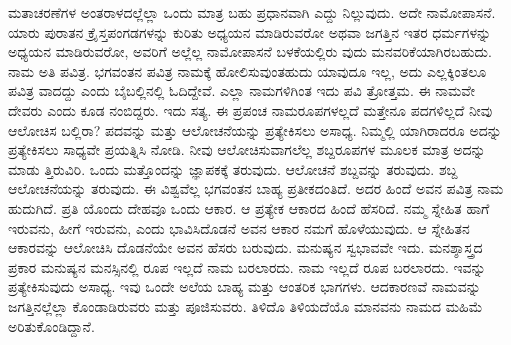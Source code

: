 ಮತಾಚರಣೆಗಳ ಅಂತರಾಳದಲ್ಲೆಲ್ಲಾ ಒಂದು ಮಾತ್ರ ಬಹು ಪ್ರಧಾನವಾಗಿ ಎದ್ದು ನಿಲ್ಲುವುದು. ಅದೇ ನಾಮೋಪಾಸನೆ. ಯಾರು ಪುರಾತನ ಕ್ರೈಸ್ತಪಂಗಡಗಳನ್ನು ಕುರಿತು ಅಧ್ಯಯನ ಮಾಡಿರುವರೋ ಅಥವಾ ಜಗತ್ತಿನ ಇತರ ಧರ್ಮಗಳನ್ನು ಅಧ್ಯಯನ ಮಾಡಿರುವರೋ, ಅವರಿಗೆ ಅಲ್ಲೆಲ್ಲ ನಾಮೋಪಾಸನೆ ಬಳಕೆಯಲ್ಲಿರು ವುದು ಮನವರಿಕೆಯಾಗಿರಬಹುದು. ನಾಮ ಅತಿ ಪವಿತ್ರ. ಭಗವಂತನ ಪವಿತ್ರ ನಾಮಕ್ಕೆ ಹೋಲಿಸುವುಂತಹುದು ಯಾವುದೂ ಇಲ್ಲ, ಅದು ಎಲ್ಲಕ್ಕಿಂತಲೂ ಪವಿತ್ರ ವಾದದ್ದು ಎಂದು ಬೈಬಲ್ಲಿನಲ್ಲಿ ಓದಿದ್ದೇವೆ. ಎಲ್ಲಾ ನಾಮಗಳಿಗಿಂತ ಇದು ಪವಿ ತ್ರೋತ್ತಮ. ಈ ನಾಮವೇ ದೇವರು ಎಂದು ಕೂಡ ನಂಬಿದ್ದರು. ಇದು ಸತ್ಯ. ಈ ಪ್ರಪಂಚ ನಾಮರೂಪಗಳಲ್ಲದೆ ಮತ್ತೇನೂ ಪದಗಳಿಲ್ಲದೆ ನೀವು ಆಲೋಚಿಸ ಬಲ್ಲಿರಾ? ಪದವನ್ನು ಮತ್ತು ಆಲೋಚನೆಯನ್ನು ಪ್ರತ್ಯೇಕಿಸಲು ಅಸಾಧ್ಯ. ನಿಮ್ಮಲ್ಲಿ ಯಾಗಿರಾದರೂ ಅದನ್ನು ಪ್ರತ್ಯೇಕಿಸಲು ಸಾಧ್ಯವೇ ಪ್ರಯತ್ನಿಸಿ ನೋಡಿ. ನೀವು ಆಲೋಚಿಸುವಾಗಲೆಲ್ಲ ಶಬ್ದರೂಪಗಳ ಮೂಲಕ ಮಾತ್ರ ಅದನ್ನು ಮಾಡು ತ್ತಿರುವಿರಿ. ಒಂದು ಮತ್ತೊಂದನ್ನು ಜ್ಞಾಪಕಕ್ಕೆ ತರುವುದು. ಆಲೋಚನೆ ಶಬ್ದವನ್ನು ತರುವುದು. ಶಬ್ದ ಆಲೋಚನೆಯನ್ನು ತರುವುದು. ಈ ವಿಶ್ವವೆಲ್ಲ ಭಗವಂತನ ಬಾಹ್ಯ ಪ್ರತೀಕದಂತಿದೆ. ಅದರ ಹಿಂದೆ ಅವನ ಪವಿತ್ರ ನಾಮ ಹುದುಗಿದೆ. ಪ್ರತಿ ಯೊಂದು ದೇಹವೂ ಒಂದು ಆಕಾರ. ಆ ಪ್ರತ್ಯೇಕ ಆಕಾರದ ಹಿಂದೆ ಹೆಸರಿದೆ. ನಮ್ಮ ಸ್ನೇಹಿತ ಹಾಗೆ ಇರುವನು, ಹೀಗೆ ಇರುವನು, ಎಂದು ಭಾವಿಸಿದೊಡನೆ ಅವನ ಆಕಾರ ನಮಗೆ ಹೊಳೆಯುವುದು. ಆ ಸ್ನೇಹಿತನ ಆಕಾರವನ್ನು ಆಲೋಚಿಸಿ ದೊಡನೆಯೇ ಅವನ ಹೆಸರು ಬರುವುದು. ಮನುಷ್ಯನ ಸ್ವಭಾವವೇ ಇದು. ಮನಶ್ಶಾಸ್ತ್ರದ ಪ್ರಕಾರ ಮನುಷ್ಯನ ಮನಸ್ಸಿನಲ್ಲಿ ರೂಪ ಇಲ್ಲದೆ ನಾಮ ಬರಲಾರದು. ನಾಮ ಇಲ್ಲದೆ ರೂಪ ಬರಲಾರದು. ಇವನ್ನು ಪ್ರತ್ಯೇಕಿಸುವುದು ಅಸಾಧ್ಯ. ಇವು ಒಂದೇ ಅಲೆಯ ಬಾಹ್ಯ ಮತ್ತು ಆಂತರಿಕ ಭಾಗಗಳು. ಆದಕಾರಣವೆ ನಾಮವನ್ನು ಜಗತ್ತಿನಲ್ಲೆಲ್ಲಾ ಕೊಂಡಾಡಿರುವರು ಮತ್ತು ಪೂಜಿಸುವರು. ತಿಳಿದೊ ತಿಳಿಯದೆಯೊ ಮಾನವನು ನಾಮದ ಮಹಿಮೆ ಅರಿತುಕೊಂಡಿದ್ದಾನೆ.

